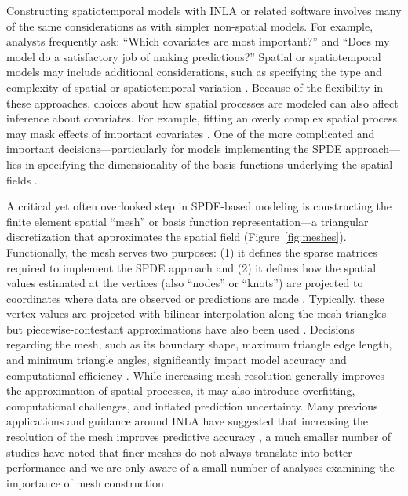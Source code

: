 \documentclass[11pt]{article}
\begin{document}
Constructing spatiotemporal models with INLA or related software involves many
of the same considerations as with simpler non-spatial models. For example,
analysts frequently ask: ``Which covariates are most important?'' and ``Does my
model do a satisfactory job of making predictions?'' Spatial or spatiotemporal
models may include additional considerations, such as specifying the type and
complexity of spatial or spatiotemporal variation \citep{anderson_black_2019}.
Because of the flexibility in these approaches, choices about how spatial
processes are modeled can also affect inference about covariates. For example,
fitting an overly complex spatial process may mask effects of important
covariates \citep{dambly2023}. One of the more complicated and important
decisions---particularly for models implementing the SPDE approach---lies in
specifying the dimensionality of the basis functions underlying the spatial
fields \citep{lindgren_bayesian_2015}.

A critical yet often overlooked step in SPDE-based modeling is constructing the
finite element spatial ``mesh'' or basis function representation---a triangular
discretization that approximates the spatial field (Figure~\ref{fig:meshes}).
Functionally, the mesh serves two purposes: (1) it defines the sparse matrices
required to implement the SPDE approach and (2) it defines how the spatial
values estimated at the vertices (also ``nodes'' or ``knots'') are projected to
coordinates where data are observed or predictions are made
\citep{lindgren_explicit_2011,lindgren_bayesian_2015}. Typically, these vertex
values are projected with bilinear interpolation along the mesh triangles
\citep{lindgren_explicit_2011} but piecewise-contestant approximations have
also been used \citep[e.g.,][]{thorson2015}. Decisions regarding the mesh, such
as its boundary shape, maximum triangle edge length, and minimum triangle
angles, significantly impact model accuracy and computational efficiency
\citep{gomez-rubio_bayesian}. While increasing mesh resolution generally
improves the approximation of spatial processes, it may also introduce
overfitting, computational challenges, and inflated prediction uncertainty.
Many previous applications and guidance around INLA have suggested that
increasing the resolution of the mesh improves predictive accuracy
\citep{godana_dynamic_2019,wilson_evaluating_2021,williamson_spatiotemporal,thorson2019},
a much smaller number of studies have noted that finer meshes do not always
translate into better performance \citep{huang_evaluating_2017} and we are only
aware of a small number of analyses examining the importance of mesh
construction \citep{righetto_choice_2020,roste_2020,dambly2023}.
\end{document}
